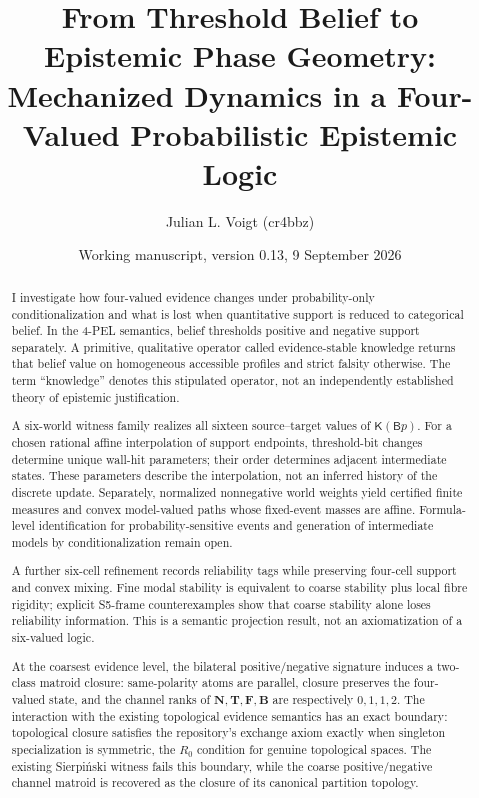 \documentclass[11pt,a4paper]{article}
\title{From Threshold Belief to Epistemic Phase Geometry:\\Mechanized Dynamics in a Four-Valued Probabilistic Epistemic Logic}
\author{Julian L. Voigt (cr4bbz)}
\date{Working manuscript, version 0.13, 9 September 2026}
\theoremstyle{definition}
\newcommand{\Tval}{\mathbf{T}}
\newcommand{\Fval}{\mathbf{F}}
\newcommand{\Bval}{\mathbf{B}}
\newcommand{\Nval}{\mathbf{N}}
\newcommand{\Bel}{\mathsf{B}}
\newcommand{\Know}{\mathsf{K}}
\begin{document}
\maketitle

\begin{abstract}
I investigate how four-valued evidence changes under probability-only conditionalization and what is lost when quantitative support is reduced to categorical belief. In the 4-PEL semantics, belief thresholds positive and negative support separately. A primitive, qualitative operator called evidence-stable knowledge returns that belief value on homogeneous accessible profiles and strict falsity otherwise. The term ``knowledge'' denotes this stipulated operator, not an independently established theory of epistemic justification.

A six-world witness family realizes all sixteen source--target values of \(\Know(\Bel p)\). For a chosen rational affine interpolation of support endpoints, threshold-bit changes determine unique wall-hit parameters; their order determines adjacent intermediate states. These parameters describe the interpolation, not an inferred history of the discrete update. Separately, normalized nonnegative world weights yield certified finite measures and convex model-valued paths whose fixed-event masses are affine. Formula-level identification for probability-sensitive events and generation of intermediate models by conditionalization remain open.

A further six-cell refinement records reliability tags while preserving four-cell support and convex mixing. Fine modal stability is equivalent to coarse stability plus local fibre rigidity; explicit S5-frame counterexamples show that coarse stability alone loses reliability information. This is a semantic projection result, not an axiomatization of a six-valued logic.

At the coarsest evidence level, the bilateral positive/negative signature induces a two-class matroid closure: same-polarity atoms are parallel, closure preserves the four-valued state, and the channel ranks of \(\Nval,\Tval,\Fval,\Bval\) are respectively \(0,1,1,2\). The interaction with the existing topological evidence semantics has an exact boundary: topological closure satisfies the repository's exchange axiom exactly when singleton specialization is symmetric, the \(R_0\) condition for genuine topological spaces. The existing Sierpiński witness fails this boundary, while the coarse positive/negative channel matroid is recovered as the closure of its canonical partition topology.


\end{abstract}
\end{document}
